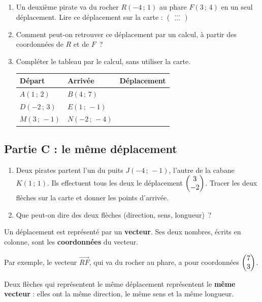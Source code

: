 \documentclass{article}
\newcommand{\dep}[2]{{\renewcommand{\arraystretch}{1}\begin{pmatrix} #1 \\ #2 \end{pmatrix}}}
\newcommand{\depvide}{\begin{pmatrix} \dots \\ \dots \end{pmatrix}}
\begin{document}
\begin{enumerate}[resume]
  \item Un deuxième pirate va du rocher $R(-4\,;\,1)$ au phare $F(3\,;\,4)$ en un seul déplacement. Lire ce déplacement sur la carte : $\depvide$

  \item Comment peut-on retrouver ce déplacement par un calcul, à partir des coordonnées de $R$ et de $F$~?

  \medskip
  \dotfill

  \item Compléter le tableau par le calcul, sans utiliser la carte.

  \medskip
  \begin{center}
    \renewcommand{\arraystretch}{2.2}
    \begin{tabular}{|C{3.2cm}|C{3.2cm}|C{4.8cm}|}
      \hline
      \textbf{Départ} & \textbf{Arrivée} & \textbf{Déplacement} \\ \hline
      $A(1\,;\,2)$ & $B(4\,;\,7)$ & \\ \hline
      $D(-2\,;\,3)$ & $E(1\,;\,-1)$ & \\ \hline
      $M(3\,;\,-1)$ & $N(-2\,;\,-4)$ & \\ \hline
    \end{tabular}
  \end{center}
\end{enumerate}

\subsection*{Partie C : le même déplacement}

\begin{enumerate}[resume]
  \item Deux pirates partent l'un du puits $J(-4\,;\,-1)$, l'autre de la cabane $K(1\,;\,1)$. Ils effectuent tous les deux le déplacement $\dep{3}{-2}$.
  Tracer les deux flèches sur la carte et donner les points d'arrivée.

  \medskip
  \dotfill

  \item Que peut-on dire des deux flèches (direction, sens, longueur)~?

  \medskip
  \dotfill
\end{enumerate}

\begin{tcolorbox}[colback=blue!4, colframe=blue!55!black, fonttitle=\bfseries, title=Vocabulaire]
  Un déplacement est représenté par un \textbf{vecteur}. Ses deux nombres, écrits en colonne, sont les \textbf{coordonnées} du vecteur.

  Par exemple, le vecteur $\overrightarrow{RF}$, qui va du rocher au phare, a pour coordonnées $\dep{7}{3}$.

  Deux flèches qui représentent le même déplacement représentent le \textbf{même vecteur} : elles ont la même direction, le même sens et la même longueur.
\end{tcolorbox}
\end{document}
